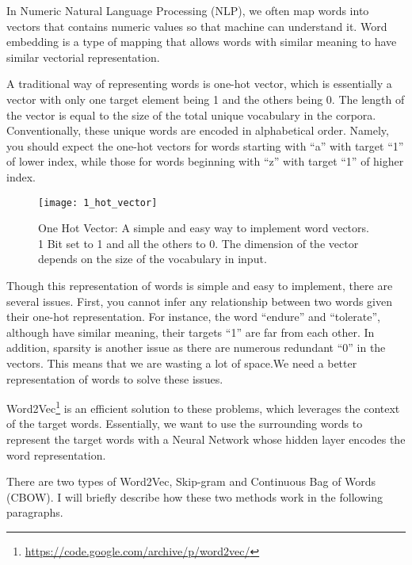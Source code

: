 In Numeric Natural Language Processing (NLP), we often map words into vectors that contains numeric values so that machine can understand it. Word embedding is a type of mapping that allows words with similar meaning to have similar vectorial representation.



A traditional way of representing words is one-hot vector, which is essentially a vector with only one target element being 1 and the others being 0. The length of the vector is equal to the size of the total unique vocabulary in the corpora. Conventionally, these unique words are encoded in alphabetical order. Namely, you should expect the one-hot vectors for words starting with “a” with target “1” of lower index, while those for words beginning with “z” with target “1” of higher index.


\begin{figure}[ht]
    \centering
    \texttt{[image: 1\_hot\_vector]}
    \caption[One Hot vector]{One Hot Vector: A simple and easy way to implement word vectors. 1 Bit set to 1 and all the others to 0. The dimension of the vector depends on the size of the vocabulary in input.}
    \label{fig:1_hot_vector}
\end{figure}

Though this representation of words is simple and easy to implement, there are several issues. First, you cannot infer any relationship between two words given their one-hot representation. For instance, the word “endure” and “tolerate”, although have similar meaning, their targets “1” are far from each other. In addition, sparsity is another issue as there are numerous redundant “0” in the vectors. This means that we are wasting a lot of space.We need a better representation of words to solve these issues.



Word2Vec\footnote{\url{https://code.google.com/archive/p/word2vec/}} is an efficient solution to these problems, which leverages the context of the target words. Essentially, we want to use the surrounding words to represent the target words with a Neural Network whose hidden layer encodes the word representation.

There are two types of Word2Vec, Skip-gram and Continuous Bag of Words (CBOW). I will briefly describe how these two methods work in the following paragraphs.

